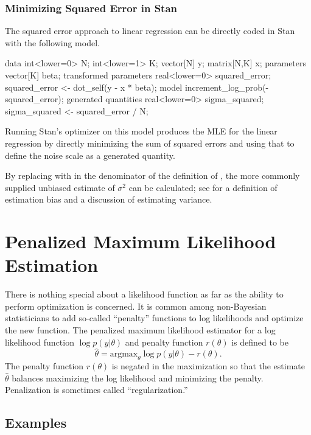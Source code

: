 \subsubsection{Minimizing Squared Error in Stan}

The squared error approach to linear regression can be directly coded
in Stan with the following model.
%
\begin{stancode}
data {
  int<lower=0> N;
  int<lower=1> K;
  vector[N] y;
  matrix[N,K] x;
}
parameters {
  vector[K] beta;
}
transformed parameters {
  real<lower=0> squared_error;
  squared_error <- dot_self(y - x * beta);
}
model {
  increment_log_prob(-squared_error);
}
generated quantities {
  real<lower=0> sigma_squared;
  sigma_squared <- squared_error / N;
}
\end{stancode}
%
Running Stan's optimizer on this model produces the MLE for the linear
regression by directly minimizing the sum of squared errors and using
that to define the noise scale as a generated quantity.

By replacing  with  in the denominator of the
definition of , the more commonly supplied
unbiased estimate of $\sigma^2$ can be calculated; see
 for a definition of estimation bias and a
discussion of estimating variance.



\section{Penalized Maximum Likelihood Estimation}

There is nothing special about a likelihood function as far as the
ability to perform optimization is concerned.  It is common among
non-Bayesian statisticians to add so-called ``penalty'' functions
to log likelihoods and optimize the new function.  The penalized
maximum likelihood estimator for a log likelihood function
$\log p(y|\theta)$ and penalty function $r(\theta)$ is defined to be
\[
\hat{\theta} = \mbox{argmax}_{\theta} \log p(y|\theta) - r(\theta).
\]
The penalty function $r(\theta)$ is negated in the maximization so
that the estimate $\hat{\theta}$ balances maximizing the log
likelihood and minimizing the penalty.  Penalization is sometimes
called ``regularization.''


\subsection{Examples}\label{penalized-mle-examples}

